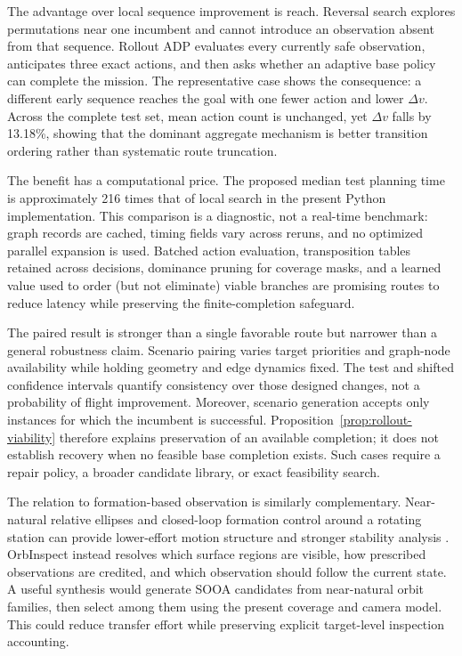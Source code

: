 \documentclass{IEEEtaes}
\theoremstyle{remark}
\theoremstyle{plain}
\begin{document}
The advantage over local sequence improvement is reach. Reversal search explores permutations near one incumbent and cannot introduce an observation absent from that sequence. Rollout ADP evaluates every currently safe observation, anticipates three exact actions, and then asks whether an adaptive base policy can complete the mission. The representative case shows the consequence: a different early sequence reaches the goal with one fewer action and lower $\Delta v$. Across the complete test set, mean action count is unchanged, yet $\Delta v$ falls by 13.18\%, showing that the dominant aggregate mechanism is better transition ordering rather than systematic route truncation.

The benefit has a computational price. The proposed median test planning time is approximately 216 times that of local search in the present Python implementation. This comparison is a diagnostic, not a real-time benchmark: graph records are cached, timing fields vary across reruns, and no optimized parallel expansion is used. Batched action evaluation, transposition tables retained across decisions, dominance pruning for coverage masks, and a learned value used to order (but not eliminate) viable branches are promising routes to reduce latency while preserving the finite-completion safeguard.

The paired result is stronger than a single favorable route but narrower than a general robustness claim. Scenario pairing varies target priorities and graph-node availability while holding geometry and edge dynamics fixed. The test and shifted confidence intervals quantify consistency over those designed changes, not a probability of flight improvement. Moreover, scenario generation accepts only instances for which the incumbent is successful. Proposition~\ref{prop:rollout-viability} therefore explains preservation of an available completion; it does not establish recovery when no feasible base completion exists. Such cases require a repair policy, a broader candidate library, or exact feasibility search.

The relation to formation-based observation is similarly complementary. Near-natural relative ellipses and closed-loop formation control around a rotating station can provide lower-effort motion structure and stronger stability analysis \cite{zhou2026formation}. OrbInspect instead resolves which surface regions are visible, how prescribed observations are credited, and which observation should follow the current state. A useful synthesis would generate SOOA candidates from near-natural orbit families, then select among them using the present coverage and camera model. This could reduce transfer effort while preserving explicit target-level inspection accounting.
\end{document}
